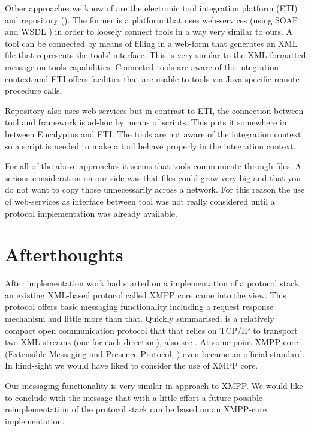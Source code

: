 \documentclass{article}
\begin{document}
   Other approaches we know of are the electronic tool integration platform
   (ETI) \cite{RICVT} and repository (\cite{SFAV}). The former is a platform
   that uses web-services (using SOAP \cite{SOAP} and WSDL \cite{2001-WSDL})
   in order to loosely connect tools in a way very similar to ours. A tool can
   be connected by means of filling in a web-form that generates an XML file
   that represents the tools' interface.  This is very similar to the XML
   formatted message on tools capabilities. Connected tools are aware of the
   integration context and ETI offers facilities that are usable to tools via
   Java specific remote procedure calls.
   
   Repository also uses web-services but in contrast to ETI, the connection
   between tool and framework is ad-hoc by means of scripts. This puts it
   somewhere in between Eucalyptus and ETI. The tools are not aware of the
   integration context so a script is needed to make a tool behave properly in
   the integration context.
 
   For all of the above approaches it seems that tools communicate through
   files.  A serious consideration on our side was that files could grow very
   big and that you do not want to copy those unnecessarily across a network.
   For this reason the use of web-services as interface between tool was not
   really considered until a protocol implementation was already available.

  \section{Afterthoughts}

   After implementation work had started on a implementation of a protocol
   stack, an existing XML-based protocol called XMPP core came into the view.
   This protocol offers basic messaging functionality including a request
   response mechanism and little more than that.  Quickly summarised: is a
   relatively compact open communication protocol that that relies on TCP/IP to
   transport two XML streams (one for each direction), also see
   \cite{Sperberg-McQueen:06:EML}.  At some point XMPP core (Extensible
   Messaging and Presence Protocol, \cite{rfc3920}) even became an official
   standard. In hind-sight we would have liked to consider the use of XMPP
   core.

   Our messaging functionality is very similar in approach to XMPP. We would
   like to conclude with the message that with a little effort a future
   possible reimplementation of the protocol stack can be based on an XMPP-core
   implementation.
\end{document}
